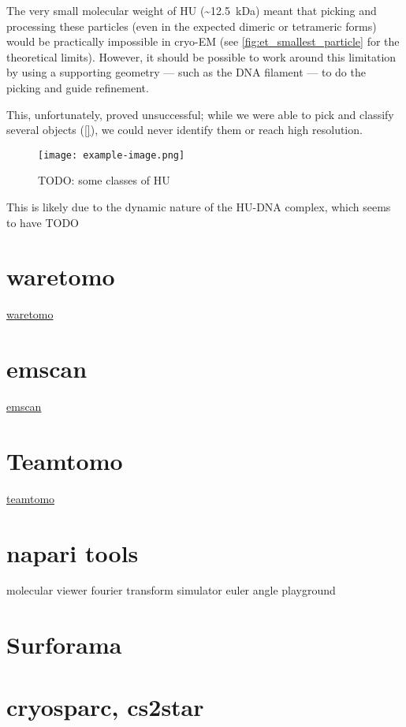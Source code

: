 The very small molecular weight of HU (\sim\qty{12.5}{\kilo\dalton}) meant that picking and processing these particles (even in the expected dimeric or tetrameric forms) would be practically impossible in cryo-EM (see \autoref{fig:et_smallest_particle} for the theoretical limits).
However, it should be possible to work around this limitation by using a supporting geometry --- such as the DNA filament --- to do the picking and guide refinement.

This, unfortunately, proved unsuccessful; while we were able to pick and classify several objects (\autoref{}), we could never identify them or reach high resolution.

\begin{figure}[ht]
    \centering
    \texttt{[image: example-image.png]}
    \caption{TODO: some classes of HU}
    \label{fig:hu_classes}
\end{figure}

This is likely due to the dynamic nature of the HU-DNA complex, which seems to have TODO

\section{waretomo}

\href{https://gihub.com/brisvag/waretomo}{waretomo}

\section{emscan}

\href{https://gihub.com/brisvag/emscan}{emscan}

\section{Teamtomo}

\href{https://teamtomo.org}{teamtomo}
\section{napari tools}
molecular viewer
fourier transform simulator
euler angle playground

\section{Surforama}

\section{cryosparc, cs2star}

